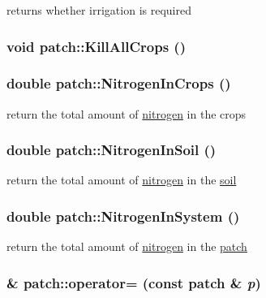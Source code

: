 returns whether irrigation is required \hypertarget{classpatch_a2f798a718984143550119b1f639af144}{
\subsubsection[{KillAllCrops}]{\setlength{\rightskip}{0pt plus 5cm}void patch::KillAllCrops ()}}
\label{classpatch_a2f798a718984143550119b1f639af144}
\hypertarget{classpatch_ae9173a337c4a025669947a8cd64f5d2e}{
\subsubsection[{NitrogenInCrops}]{\setlength{\rightskip}{0pt plus 5cm}double patch::NitrogenInCrops ()}}
\label{classpatch_ae9173a337c4a025669947a8cd64f5d2e}


return the total amount of \hyperlink{classnitrogen}{nitrogen} in the crops \hypertarget{classpatch_adcb1581cac2687cd3d610faec438d935}{
\subsubsection[{NitrogenInSoil}]{\setlength{\rightskip}{0pt plus 5cm}double patch::NitrogenInSoil ()}}
\label{classpatch_adcb1581cac2687cd3d610faec438d935}


return the total amount of \hyperlink{classnitrogen}{nitrogen} in the \hyperlink{classsoil}{soil} \hypertarget{classpatch_a9c12288512a19b8e44eb15f532f34a4d}{
\subsubsection[{NitrogenInSystem}]{\setlength{\rightskip}{0pt plus 5cm}double patch::NitrogenInSystem ()}}
\label{classpatch_a9c12288512a19b8e44eb15f532f34a4d}


return the total amount of \hyperlink{classnitrogen}{nitrogen} in the \hyperlink{classpatch}{patch} \hypertarget{classpatch_aaa485c520a0fb67c68b2a5cfbe12d99e}{
\subsubsection[{operator=}]{\& patch::operator= (const {\bf patch} \& {\em p})}}
\label{classpatch_aaa485c520a0fb67c68b2a5cfbe12d99e}


